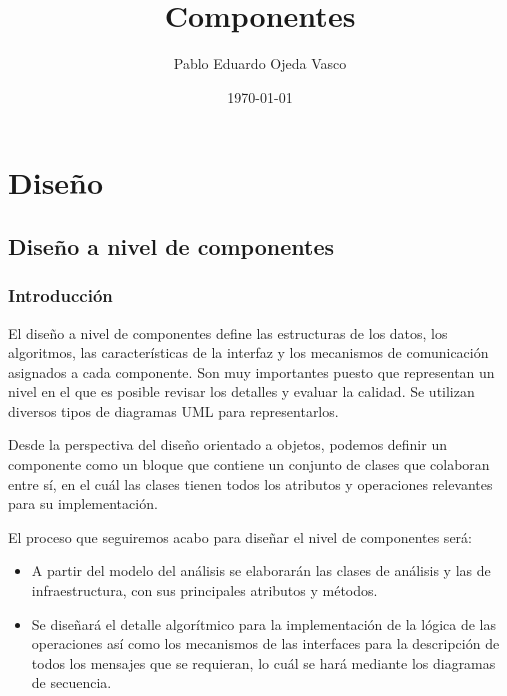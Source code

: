 \documentclass[a4paper,oneside,11pt]{book}
\begin{document}
\title{Componentes}
\author{Pablo Eduardo Ojeda Vasco}
\date{\today}



	\maketitle
%
%
\chapter{Diseño} %
	\label{sec:diseno}

	\section{Diseño a nivel de componentes} %
	\label{sec:componentes}
	
	\subsection{Introducción} %
		\label{sub:comp_introduccion}
	
		El diseño a nivel de componentes define las estructuras de los datos, los algoritmos, las características de la interfaz y los mecanismos de comunicación asignados a cada componente. Son muy importantes puesto que representan un nivel en el que es posible revisar los detalles y evaluar la calidad. Se utilizan diversos tipos de diagramas UML para representarlos.
		
		Desde la perspectiva del diseño orientado a objetos, podemos definir  un componente como un bloque que contiene un conjunto de clases que colaboran entre sí, en el cuál las clases tienen todos los atributos y operaciones relevantes para su implementación.
		
		El proceso que seguiremos acabo para diseñar el nivel de componentes será:
		\begin{itemize}
			\item A partir del modelo del análisis se elaborarán las clases de análisis y las de infraestructura, con sus principales atributos y métodos.
			\item Se diseñará el detalle algorítmico para la implementación de la lógica de las operaciones así como los mecanismos de las interfaces para la descripción de todos los mensajes que se requieran, lo cuál se hará mediante los diagramas de secuencia.
		\end{itemize}
	
\end{document}
